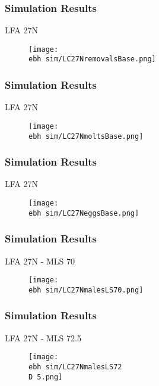 \documentclass{beamer}
\newcommand{\ebh}{\string~/bio.data/bio.lobster/figures/LFA2733Framework2018/} %
\newcommand{\D}{.}
\begin{document}
\begin{frame}
\frametitle{Simulation Results}
LFA 27N 
\begin{figure}
        \begin{center}
            \texttt{[image: \\ebh sim/LC27NremovalsBase.png]}
        \end{center}
    \end{figure}
\end{frame}


\begin{frame}
\frametitle{Simulation Results}
LFA 27N 
\begin{figure}
        \begin{center}
            \texttt{[image: \\ebh sim/LC27NmoltsBase.png]}
        \end{center}
    \end{figure}
\end{frame}


\begin{frame}
\frametitle{Simulation Results}
LFA 27N 
\begin{figure}
        \begin{center}
            \texttt{[image: \\ebh sim/LC27NeggsBase.png]}
        \end{center}
    \end{figure}
\end{frame}





\begin{frame}
\frametitle{Simulation Results}
LFA 27N - MLS 70
\begin{figure}
        \begin{center}
            \texttt{[image: \\ebh sim/LC27NmalesLS70.png]}
        \end{center}
    \end{figure}
\end{frame}


\begin{frame}
\frametitle{Simulation Results}
LFA 27N - MLS 72.5
\begin{figure}
        \begin{center}
            \texttt{[image: \\ebh sim/LC27NmalesLS72\\D 5.png]}
        \end{center}
    \end{figure}
\end{frame}
\end{document}

